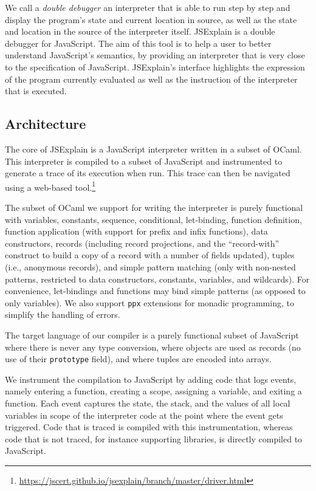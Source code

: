 \documentclass[twocolumn,a4paper]{article}
\begin{document}
We call a \emph{double debugger} an interpreter that is able to run step by step
and display the program's state and current location in source, as well as the
state and location in the source of the interpreter itself. JSExplain is a
double debugger for JavaScript. The aim of this tool is to help a user to better
understand JavaScript's semantics, by providing an interpreter that is very
close to the specification of JavaScript. JSExplain's interface highlights the
expression of the program currently evaluated as well as the instruction of the
interpreter that is executed.

\subsection{Architecture}

The core of JSExplain is a JavaScript interpreter written in a subset of OCaml.
This interpreter is compiled to a subset of JavaScript and instrumented to
generate a trace of its execution when run. This trace can then be navigated
using a web-based
tool.\footnote{\url{https://jscert.github.io/jsexplain/branch/master/driver.html}}

The subset of OCaml we support for writing the interpreter is purely functional
with variables, constants, sequence, conditional, let-binding, function
definition, function application (with support for prefix and infix functions),
data constructors, records (including record projections, and the
``record-with'' construct to build a copy of a record with a number of fields
updated), tuples (i.e., anonymous records), and simple pattern matching (only
with non-nested patterns, restricted to data constructors, constants, variables,
and wildcards). For convenience, let-bindings and functions may bind simple
patterns (as opposed to only variables). We also support \texttt{ppx} extensions
for monadic programming, to simplify the handling of errors.

The target language of our compiler is a purely functional subset of JavaScript
where there is never any type conversion, where objects are used as records (no
use of their \texttt{prototype} field), and where tuples are encoded into
arrays.

We instrument the compilation to JavaScript by adding code that logs events,
namely entering a function, creating a scope, assigning a variable, and exiting
a function. Each event captures the state, the stack, and the values of all
local variables in scope of the interpreter code at the point where the event
gets triggered. Code that is traced is compiled with this instrumentation,
whereas code that is not traced, for instance supporting libraries, is directly
compiled to JavaScript.
\end{document}
